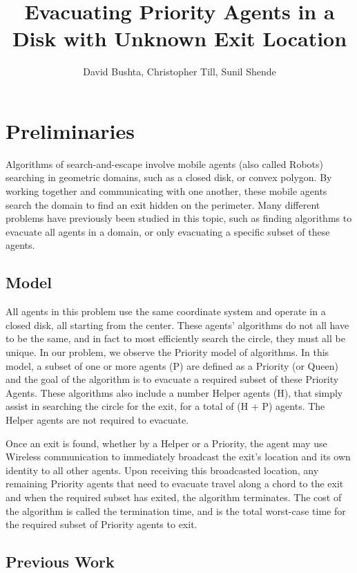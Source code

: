 \documentclass[11pt]{amsart}
\title{Evacuating Priority Agents in a Disk with Unknown Exit Location}
\author{David Bushta, Christopher Till, Sunil Shende}
\begin{document}
\maketitle
\section{Preliminaries}

Algorithms of search-and-escape involve mobile agents (also called Robots)
searching in geometric domains, such as a closed disk, or convex polygon. By
working together and communicating with one another, these mobile agents search
the domain to find an exit hidden on the perimeter. Many different problems have
previously been studied in this topic, such as finding algorithms to evacuate all
agents in a domain, or only evacuating a specific subset of these agents.

\subsection{Model}


All agents in this problem use the same coordinate system and operate in a closed
disk, all starting from the center. These agents' algorithms do not all have to be the same,
and in fact to most efficiently search the circle, they must all be unique.
In our problem, we observe the Priority model of algorithms. In this model, a
subset of one or more agents (P) are defined as a Priority (or Queen) and the goal
of the algorithm is to evacuate a required subset of these Priority Agents. These
algorithms also include a number Helper agents (H), that simply assist in searching the circle
for the exit, for a total of (H + P) agents. The Helper agents are not required to evacuate.


Once an exit is found, whether by a Helper or a Priority, the agent may use
Wireless communication to immediately broadcast the exit's location and its own identity to all other agents.
Upon receiving this broadcasted location, any remaining Priority agents that
need to evacuate travel along a chord to the exit and when the required subset has exited, the algorithm terminates.
The cost of the algorithm is called the termination time, and is the total worst-case
time for the required subset of Priority agents to exit.

\subsection{Previous Work}
\end{document}
